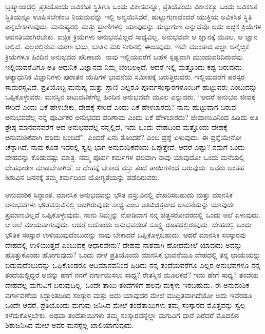 \vskip 0.2cm

ಬ್ರಹ್ಮಾಂಡದಲ್ಲಿ ಪ್ರತಿಯೊಂದು ಅವಿಕಸಿತ ಸ್ಥಿತಿಗೂ ಒಂದು ವಿಕಾಸವನ್ನೂ, ಪ್ರತಿಯೊಂದು ವಿಕಾಸಕ್ಕೂ ಒಂದು ಅವಿಕಸಿತ ಸ್ಥಿತಿಯನ್ನೂ ಊಹಿಸಬೇಕೆಂಬ ನಿಯಮವನ್ನು ಇಲ್ಲಿ ಅನ್ವಯಿಸಿದರೆ, ಹುಟ್ಟುಗುಣವೆಂದರೆ ಯುಕ್ತಿಯ ಅವಿಕಸಿತ ಸ್ಥಿತಿ ಎನ್ನಬೇಕಾಗುವುದು. ಮನುಷ್ಯರಲ್ಲಿ ಮತ್ತು ಪ್ರಾಣಿಗಳಲ್ಲಿ ಯಾವುದನ್ನು ಹುಟ್ಟುಗುಣ ಎನ್ನುವೆವೊ ಅದು ಐಚ್ಛಿಕ ಕ್ರಿಯೆಗಳ ಅವನತಿಯಾಗಿರಬೇಕು. ಐಚ್ಛಿಕ ಕ್ರಿಯೆಗಳು ಅನುಭವವಿಲ್ಲದೆ ಸಾಧ್ಯವಿಲ್ಲ. ಅನುಭವವೇ ಆ ಜ್ಞಾನಕ್ಕೆ ಮೂಲ, ಆ ಜ್ಞಾನ ಅಲ್ಲಿದೆ. ಎಲ್ಲರಲ್ಲಿರುವ ಮರಣ ಭಯ, ಬಾತಿನ ಮರಿ ನೀರಿನಲ್ಲಿ ಈಜುವುದು, ಇವೇ ಮುಂತಾದ ಎಲ್ಲಾ ಅನೈಚ್ಛಿಕ ಕ್ರಿಯೆಗಳೂ ಹಿಂದಿನ ಅನುಭವದ ಪರಿಣಾಮ. ನಾವು ಇಲ್ಲಿಯವರೆಗೆ ಬಹಳ ಸ್ಪಷ್ಟವಾಗಿ ಮುಂದುವರಿದಿರುವೆವು. ಇಲ್ಲಿಯವರೆವಿಗೂ ಅತಿ ಆಧುನಿಕ ವಿಜ್ಞಾನವು ನಿಮ್ಮ ಬೆಂಬಲಕ್ಕಿದೆ. ಆದರೆ ಇಲ್ಲಿ ಮತ್ತೊಂದು ಕಷ್ಟ ಬರುವುದು. ಅತ್ಯಾಧುನಿಕ ವಿಜ್ಞಾನಿಗಳು ಪುರಾತನ ಋಷಿಗಳ ಭಾವನೆಯ ಸಮೀಪಕ್ಕೆ ಬರುತ್ತಿರುವರು. ಇಲ್ಲಿಯವರೆಗೆ ಪರಸ್ಪರ ಸಾಮರಸ್ಯವಿದೆ. ಪ್ರತಿಯೊಬ್ಬ ಮನುಷ್ಯ ಮತ್ತು ಪ್ರಾಣಿ ಎಲ್ಲರೂ ಪೂರ್ವಸಂಸ್ಕಾರಗಳೊಂದಿಗೆ ಹುಟ್ಟುವರು ಎಂಬುದನ್ನು ಒಪ್ಪಿಕೊಳ್ಳುವರು. ಮನಸ್ಸಿನ ಚಟುವಟಿಕೆಗೆಲ್ಲ ಹಿಂದಿನ ಅನುಭವವೇ ಮೂಲ ಎನ್ನುವರು. “ಆದರೆ ಅನುಭವ ಜೀವಕ್ಕೆ ಸೇರಿದೆ ಎಂದು ಏಕೆ ಹೇಳಬೇಕು, ದೇಹಕ್ಕೆ ಸೇರಿದೆ ಎಂದು ಏಕೆ ಹೇಳಬಾರದು? ನಾನು ಹುಟ್ಟುವಾಗ ಬರುವ ಅನುಭವವೆಲ್ಲ ನನ್ನ ಪೂರ್ವಿಕರ ಅನುಭವದ ಪರಿಣಾಮ ಎಂದು ಏಕೆ ಹೇಳಬಾರದು? ಜೀವಾಣುವಿನಿಂದ ಹಿಡಿದು ಅತಿ ಶ್ರೇಷ್ಠ ಮಾನವನವರೆಗೆ ಆದ ಅನುಭವವೆಲ್ಲ ನನ್ನಲ್ಲಿದೆ, ಇದು ಒಂದು ದೇಹದಿಂದ ಮತ್ತೊಂದು ದೇಹಕ್ಕೆ ಅನುವಂಶಿಕವಾಗಿ ಹರಿದು ಬಂದಿದೆ”, ಎಂದರೆ ಏನು ತೊಂದರೆ? ಎಂಬ ಪ್ರಶ್ನೆ ಏಳುವುದು. ಈ ಪ್ರಶ್ನೆಯೇನೋ ಚೆನ್ನಾಗಿದೆ. ನಾವು ಕೂಡ ಇದರಲ್ಲಿ ಸ್ವಲ್ಪ ಭಾಗ ಅನುವಂಶಿಕವೆಂದು ಒಪ್ಪುತ್ತೇವೆ. ಆದರೆ ಎಷ್ಟು? ನಮಗೆ ಒಂದು ದೇಹವನ್ನು ಕೊಡುವಷ್ಟು ಮಾತ್ರ. ನಮ್ಮ ಪೂರ್ವ ಕರ್ಮಗಳ ಫಲವಾಗಿ ನಾವು ಯಾವುದೋ ಒಂದು ಮನೆಯಲ್ಲಿ ದೇಹಧಾರಣ ಮಾಡಬೇಕಾಗಿದೆ. ಆ ದೇಹಕ್ಕೆ ಬೇಕಾದ ವಸ್ತು ತಂದೆ ತಾಯಿಗಳಿಂದ ಬರುವುದು. ಅವರು ಅಂತಹ ಶಿಶುವಿನ ಜನನಕ್ಕೆ ತಮ್ಮ ಕರ್ಮದಿಂದ ಯೋಗ್ಯತೆಯನ್ನು ಪಡೆದಿರುವರು.

\vskip 0.2cm

ಆನುವಂಶಿಕ ಸಿದ್ಧಾಂತ, ಮಾನಸಿಕ ಅನುಭವವನ್ನು ಭೌತ ವಸ್ತುವಿನಲ್ಲಿ ಶೇಖರಿಸಬಹುದು ಮತ್ತು ಮಾನಸಿಕ ಅನುಭವಗಳು ಭೌತವಸ್ತುವಿನಲ್ಲಿ ಅಡಗಿರುವುದು ಸಾಧ್ಯ ಎಂಬ ಅತಿವಿಚಿತ್ರವಾದ ಭಾವನೆಯನ್ನು ಯಾವುದೇ ಪ್ರಮಾಣವಿಲ್ಲದೆ ಒಪ್ಪಿಕೊಳ್ಳುವುದು. ನಾನು ನಿಮ್ಮನ್ನು ನೋಡಿದಾಗ ನನ್ನ ಚಿತ್ತಸರೋವರದಲ್ಲಿ ಒಂದು ಅಲೆ ಏಳುವುದು. ಆ ಅಲೆ ಮಾಯವಾಗುವುದು. ಆದರೆ ಅದೊಂದು ಅನುಭವದಂತೆ ಸೂಕ್ಷ್ಮ ರೂಪದಲ್ಲಿರುವುದು. ದೇಹದಲ್ಲಿ ಒಂದು ಭೌತಿಕ ಸಂಸ್ಕಾರ ಉಳಿಯುವುದೆಂಬುದನ್ನು ನಾವು ಬೇಕಾದರೆ ಒಪ್ಪಿಕೊಳ್ಳಬಹುದು. ಆದರೆ ಮಾನಸಿಕ ಸಂಸ್ಕಾರವು ದೇಹದಲ್ಲಿ ಉಳಿಯುತ್ತದೆ ಎಂಬುದಕ್ಕೆ ಆಧಾರವೇನು? ದೇಹವು ನಾಶವಾಗಿ ಹೋದಮೇಲೆ ಯಾವುದು ಅದನ್ನು ಹೊತ್ತುಕೊಂಡು ಹೋಗುವುದು? ಒಂದು ವೇಳೆ ಪ್ರತಿಯೊಂದು ಮಾನಸಿಕ ಭಾವನೆಯೂ ದೇಹದಲ್ಲಿ ತನ್ನ ಛಾಯೆಯನ್ನು ಬಿಡುವುದೆಂಬುದನ್ನು ಒಪ್ಪಿಕೊಂಡರೂ ಆದಿಮಾನವನಿಂದ ಹಿಡಿದು ನನ್ನ ತಂದೆಯವರೆಗೂ ಎಲ್ಲರ ಅನುಭವಗಳೂ ನನ್ನ ತಂದೆಯಲ್ಲಿದ್ದರೆ ಅವನ್ನು ಹೇಗೆ ನನಗೆ ವರ್ಗಾಯಿಸಲು ಸಾಧ್ಯ? ರೇತಸ್ಸಿನ ಮೂಲಕವೆ? ಇದು ಹೇಗೆ ಸಾಧ್ಯ? ತಂದೆಯ ದೇಹವೆಲ್ಲ ಮಗುವಿಗೆ ಬರುವುದಿಲ್ಲ. ಒಂದೇ ತಾಯಿ ತಂದೆಗಳಿಗೆ ಹಲವು ಮಕ್ಕಳು ಇರಬಹುದು. ಈ ಅನುವಂಶಿಕ ವರ್ಗಾವಣೆಯ ಸಿದ್ಧಾಂತದಿಂದ ಸಂಸ್ಕಾರ ಮತ್ತು ಅದು ಯಾವುದರ ಮೇಲೆ ಮುದ್ರಿತವಾಗಿದೆಯೋ ಅದು ಇವೆರಡೂ ಒಂದೇ ಆದರೆ, ಪ್ರತಿಯೊಂದು ಮಗುವು ಜನಿಸಿದ ಮೇಲೆ ತಂದೆತಾಯಿಗಳು ತಮ್ಮ ಸಂಸ್ಕಾರದ ಮೊತ್ತವನ್ನು ಸ್ವಲ್ಪ ಕಳೆದುಕೊಳ್ಳಬೇಕು. ಅಥವಾ ತಂದೆತಾಯಿಗಳು ತಮ್ಮ ಸಂಸ್ಕಾರವನ್ನೆಲ್ಲಾ ಮಗುವಿಗೆ ಧಾರೆ ಎರೆದರೆ ಮೊದಲಿನ ಶಿಶು\break ಜನಿಸಿದ ಮೇಲೆ ಅವರ ಮನಸ್ಸೆಲ್ಲ ಖಾಲಿಯಾಗುವುದು.

